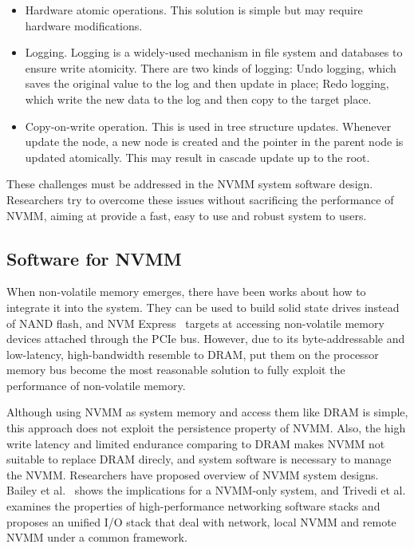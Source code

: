 \begin{itemize}
\item Hardware atomic operations. This solution is simple but may require
hardware modifications.
\item Logging. Logging is a widely-used mechanism in file system and databases
to ensure write atomicity. There are two kinds of logging: Undo logging, which
saves the original value to the log and then update in place; Redo logging,
which write the new data to the log and then copy to the target place.
\item Copy-on-write operation. This is used in tree structure updates. Whenever
update the node, a new node is created and the pointer in the parent node is
updated atomically. This may result in cascade update up to the root.
\end{itemize}

These challenges must be addressed in the NVMM system software design.
Researchers try to overcome these issues without sacrificing the performance
of NVMM, aiming at provide a fast, easy to use and robust system to users.

\subsection{Software for NVMM}
\label{sec:NVMM}


When non-volatile memory emerges, there have been works about how to
integrate it into the system. They can be used to build solid state drives
instead of NAND flash, and NVM Express~\cite{NVMe} targets at accessing
non-volatile memory devices attached through the PCIe bus. However, due to
its byte-addressable and low-latency, high-bandwidth resemble to DRAM,
put them on the processor memory bus become the most reasonable solution
to fully exploit the performance of non-volatile memory.

Although using NVMM as system memory and access them like DRAM is simple,
this approach does not exploit the persistence property of NVMM. Also, the
high write latency and limited endurance comparing to DRAM makes NVMM not
suitable to replace DRAM direcly, and system software is necessary to
manage the NVMM. Researchers have proposed overview of NVMM system designs.
Bailey et al.~\cite{systemimplications} shows the implications for a NVMM-only
system, and Trivedi et al.\cite{onestack}  examines the
properties of high-performance networking software stacks 
and proposes an unified I/O stack that deal with
network, local NVMM and remote NVMM under a common framework.


